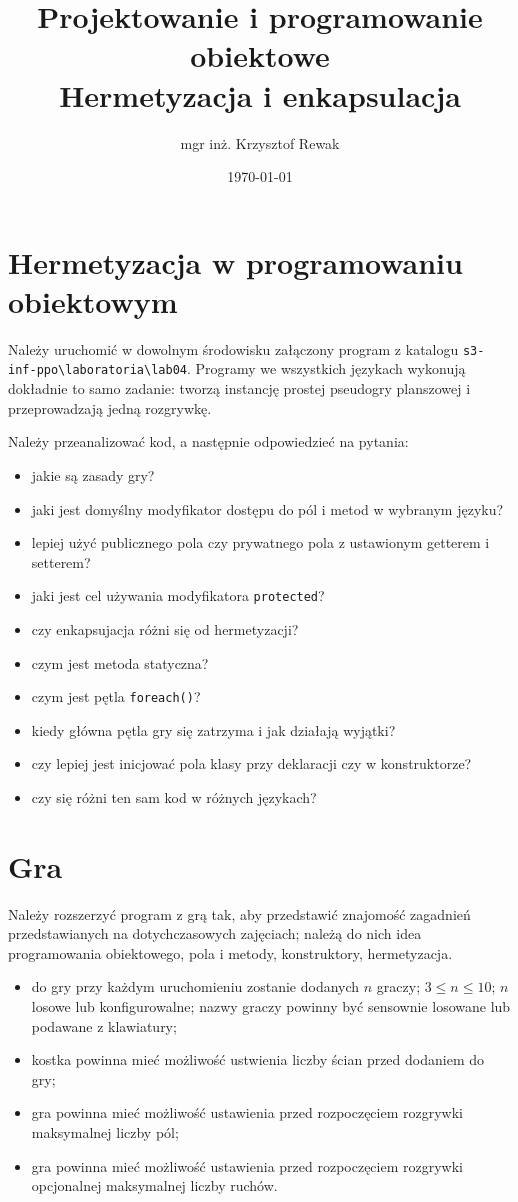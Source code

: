 \documentclass{article}
\title{
	Projektowanie i programowanie obiektowe \\
	\Huge{Hermetyzacja i enkapsulacja}
}
\author{mgr inż. Krzysztof Rewak}
\date{\today}
\begin{document}
	\maketitle

	\section{Hermetyzacja w programowaniu obiektowym}	
	Należy uruchomić w dowolnym środowisku załączony program z katalogu \texttt{s3-inf-ppo\textbackslash laboratoria\textbackslash lab04}. Programy we wszystkich językach wykonują dokładnie to samo zadanie: tworzą instancję prostej pseudogry planszowej i przeprowadzają jedną rozgrywkę.
	
	Należy przeanalizować kod, a następnie odpowiedzieć na pytania:
	\begin{itemize}
		\item jakie są zasady gry?
		\item jaki jest domyślny modyfikator dostępu do pól i metod w wybranym języku?
		\item lepiej użyć publicznego pola czy prywatnego pola z ustawionym getterem i setterem?
		\item jaki jest cel używania modyfikatora \texttt{protected}?
		\item czy enkapsujacja różni się od hermetyzacji?
		\item czym jest metoda statyczna?
		\item czym jest pętla \texttt{foreach()}?
		\item kiedy główna pętla gry się zatrzyma i jak działają wyjątki?
		\item czy lepiej jest inicjować pola klasy przy deklaracji czy w konstruktorze?
		\item czy się różni ten sam kod w różnych językach?
	\end{itemize}

	\section{Gra}
	Należy rozszerzyć program z grą tak, aby przedstawić znajomość zagadnień przedstawianych na dotychczasowych zajęciach; należą do nich idea programowania obiektowego, pola i metody, konstruktory, hermetyzacja.
	\begin{itemize}
		\item do gry przy każdym uruchomieniu zostanie dodanych $n$ graczy; $3 \leq n \leq 10$; $n$ losowe lub konfigurowalne; nazwy graczy powinny być sensownie losowane lub podawane z klawiatury;
		\item kostka powinna mieć możliwość ustwienia liczby ścian przed dodaniem do gry;
		\item gra powinna mieć możliwość ustawienia przed rozpoczęciem rozgrywki maksymalnej liczby pól;
		\item gra powinna mieć możliwość ustawienia przed rozpoczęciem rozgrywki opcjonalnej maksymalnej liczby ruchów.
	\end{itemize}
\end{document}
